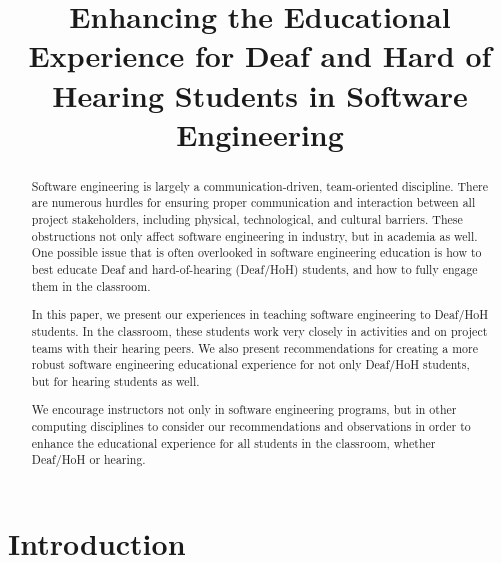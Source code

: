 \documentclass[conference]{IEEEtran}
\begin{document}
%

\title{Enhancing the Educational Experience for Deaf and Hard of Hearing Students in Software Engineering}

\author{
\and
\and
{}
}

\maketitle


\begin{abstract}
Software engineering is largely a communication-driven, team-oriented discipline. There are numerous hurdles for ensuring proper communication and interaction between all project stakeholders, including physical, technological, and cultural barriers. These obstructions not only affect software engineering in industry, but in academia as well. One possible issue that is often overlooked in software engineering education is how to best educate Deaf and hard-of-hearing (Deaf/HoH) students, and how to fully engage them in the classroom.

In this paper, we present our experiences in teaching software engineering to Deaf/HoH students. In the classroom, these students work very closely in activities and on project teams with their hearing peers. We also present recommendations for creating a more robust software engineering educational experience for not only Deaf/HoH students, but for hearing students as well.

We encourage instructors not only in software engineering programs, but in other computing disciplines to consider our recommendations and observations in order to enhance the educational experience for all students in the classroom, whether Deaf/HoH or hearing.

\end{abstract}



\section{Introduction}
\end{document}

